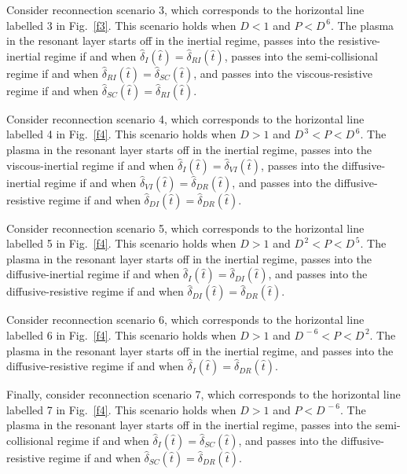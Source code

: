 \documentclass[titlepage=false,12pt]{article}
\begin{document}
Consider reconnection scenario 3, which corresponds to the horizontal line labelled 3 in Fig.~\ref{f3}. 
This scenario holds when $D<1$ and $P<D^{\,6}$. 
The plasma in the resonant layer starts off in the inertial regime, passes into the resistive-inertial regime if and when $\hat{\delta}_I(\hat{t})=\hat{\delta}_{RI}(\hat{t})$, passes into the semi-collisional regime if and when $\hat{\delta}_{RI}(\hat{t})=\hat{\delta}_{SC}(\hat{t})$, and passes into the
viscous-resistive regime if and when $\hat{\delta}_{SC}(\hat{t})=\hat{\delta}_{RI}(\hat{t})$.

Consider reconnection scenario 4, which corresponds to the horizontal line labelled 4 in Fig.~\ref{f4}. 
This scenario holds when $D>1$ and $D^{\,3} < P<D^{\,6}$. 
The plasma in the resonant layer starts off in the inertial regime, passes into the viscous-inertial regime if and when $\hat{\delta}_I(\hat{t})=\hat{\delta}_{VI}(\hat{t})$, passes into the diffusive-inertial regime if and when $\hat{\delta}_{VI}(\hat{t})=\hat{\delta}_{DR}(\hat{t})$, and passes into the
diffusive-resistive regime if and when $\hat{\delta}_{DI}(\hat{t})=\hat{\delta}_{DR}(\hat{t})$.

Consider reconnection scenario 5, which corresponds to the horizontal line labelled 5 in Fig.~\ref{f4}. 
This scenario holds when $D>1$ and $D^{\,2} < P<D^{\,5}$. 
The plasma in the resonant layer starts off in the inertial regime, passes into the diffusive-inertial regime if and when $\hat{\delta}_I(\hat{t})=\hat{\delta}_{DI}(\hat{t})$, and passes into the
diffusive-resistive regime if and when $\hat{\delta}_{DI}(\hat{t})=\hat{\delta}_{DR}(\hat{t})$.

Consider reconnection scenario 6, which corresponds to the horizontal line labelled 6 in Fig.~\ref{f4}. 
This scenario holds when $D>1$ and $D^{\,-6} < P<D^{\,2}$. 
The plasma in the resonant layer starts off in the inertial regime,  and passes into the
diffusive-resistive regime if and when $\hat{\delta}_{I}(\hat{t})=\hat{\delta}_{DR}(\hat{t})$.

Finally, consider reconnection scenario 7, which corresponds to the horizontal line labelled 7 in Fig.~\ref{f4}. 
This scenario holds when $D>1$ and $P<D^{\,-6}$. 
The plasma in the resonant layer starts off in the inertial regime, passes into the semi-collisional regime if and when $\hat{\delta}_I(\hat{t})=\hat{\delta}_{SC}(\hat{t})$, and passes into the
diffusive-resistive regime if and when $\hat{\delta}_{SC}(\hat{t})=\hat{\delta}_{DR}(\hat{t})$.

\newpage
\end{document}
